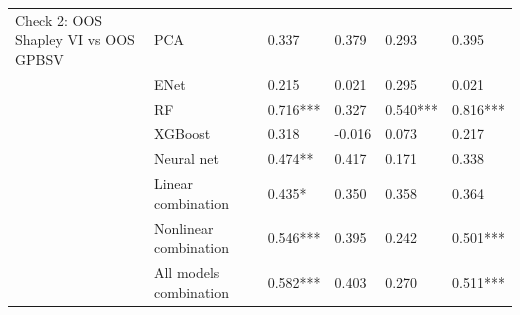 \begin{tabular}{llllll}
Check 2: OOS Shapley VI vs OOS GPBSV & PCA &     0.337 &     0.379 &     0.293 &     0.395 \\
                                     & ENet &     0.215 &     0.021 &     0.295 &     0.021 \\
                                     & RF &  0.716*** &     0.327 &  0.540*** &  0.816*** \\
                                     & XGBoost &     0.318 &    -0.016 &     0.073 &     0.217 \\
                                     & Neural net &   0.474** &     0.417 &     0.171 &     0.338 \\
                                     & Linear combination &    0.435* &     0.350 &     0.358 &     0.364 \\
                                     & Nonlinear combination &  0.546*** &     0.395 &     0.242 &  0.501*** \\
                                     & All models combination &  0.582*** &     0.403 &     0.270 &  0.511*** \\
\bottomrule
\end{tabular}
